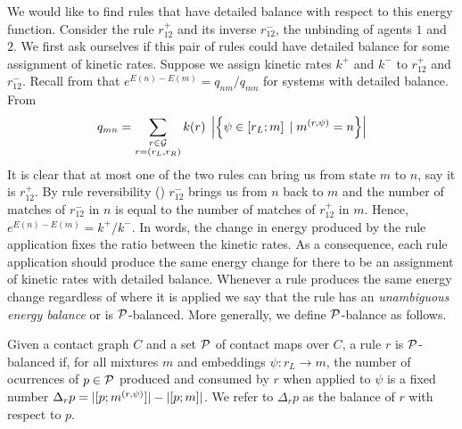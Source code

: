 We would like to find rules that have detailed balance
with respect to this energy function.
Consider the rule $r^+_{12}$ and its inverse $r^-_{12}$,
the unbinding of agents $1$ and $2$.
We first ask ourselves if this pair of rules
could have detailed balance
for some assignment of kinetic rates.
Suppose we assign kinetic rates $k^+$ and $k^-$
to $r^+_{12}$ and $r^-_{12}$.
Recall from  that $e^{E(n)-E(m)} = q_{nm}/q_{mn}$
for systems with detailed balance.
From 
\[ q_{mn} = \sum_{\substack{r \in \mathcal{G}\\r = \left(r_L,r_R\right)}}
   k(r) \; \left\lvert \left\{ \psi \in \left[r_L;m\right] \; | \; m^{(r,\psi)} = n \right\} \right\rvert
\]
It is clear that at most one of the two rules
can bring us from state $m$ to $n$, say it is $r^+_{12}$.
By rule reversibility ()
$r^-_{12}$ brings us from $n$ back to $m$
and the number of matches of $r^-_{12}$ in $n$
is equal to the number of matches of $r^+_{12}$ in $m$.
Hence, $e^{E(n)-E(m)} = k^+/k^-$.
In words, the change in energy produced by the rule application
fixes the ratio between the kinetic rates.
As a consequence,
each rule application should produce the same energy change
for there to be an assignment of kinetic rates with detailed balance.
Whenever a rule produces the same energy change
regardless of where it is applied
we say that the rule has an \emph{unambiguous energy balance}
or is $\mathcal{P}$-balanced.
More generally, we define $\mathcal{P}$-balance as follows.

\begin{definition}
  Given a contact graph $C$
  and a set $\mathcal{P}$ of contact maps over $C$,
  a rule $r$ is $\mathcal{P}$-balanced
  if, for all mixtures $m$ and embeddings $\psi: r_L \to m$,
  the number of ocurrences of $p \in \mathcal{P}$
  produced and consumed by $r$ when applied to $\psi$
  is a fixed number
  $\Delta_r p = |[p;m^{(r,\psi)}]| - \left\lvert \left[p;m\right] \right\rvert$.
  We refer to $\Delta_r p$ as the balance of $r$ with respect to $p$.
\end{definition}

